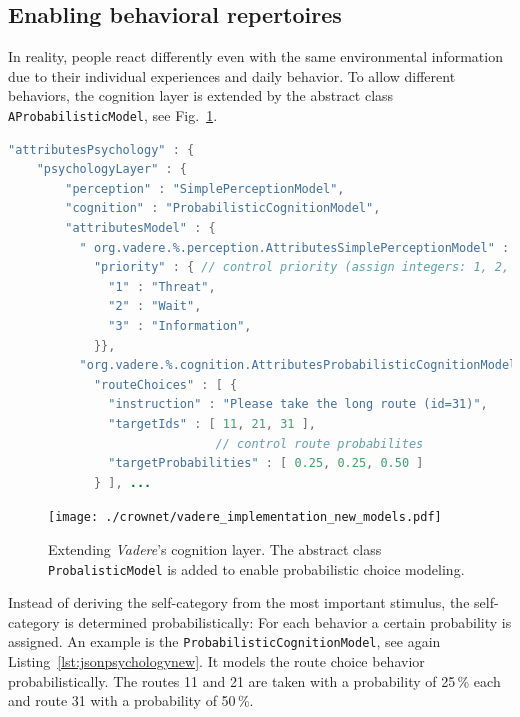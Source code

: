 \subsection{Enabling behavioral repertoires}
\label{sec:Enablingbah}

In reality, people react differently even with the same environmental information due to their individual experiences and daily behavior. To allow different behaviors, the cognition layer is extended by the abstract class \lstinline{AProbabilisticModel}, see Fig.~\ref{fig:probabilisticmodels}. 

\begin{lstlisting}[caption={Parameterization of psychological models in Vadere's scenario file. The \lstinline{targetProbabilities} parameter is a vector of probabilities. Each probability is assigned to a certain target (\lstinline{targetIds}). If the long route is recommended (\lstinline{instruction}), 25\% of the agents take target 11, 25\% take target 21. The majority (50\%) takes the long route (target 31).},language=Java,label=lst:jsonpsychologynew]
"attributesPsychology" : {
    "psychologyLayer" : {
        "perception" : "SimplePerceptionModel",
        "cognition" : "ProbabilisticCognitionModel",
        "attributesModel" : {
          " org.vadere.%.perception.AttributesSimplePerceptionModel" : {
            "priority" : { // control priority (assign integers: 1, 2, 3)
              "1" : "Threat",
              "2" : "Wait",
              "3" : "Information", 
            }},
          "org.vadere.%.cognition.AttributesProbabilisticCognitionModel" : {
            "routeChoices" : [ {
              "instruction" : "Please take the long route (id=31)",
              "targetIds" : [ 11, 21, 31 ],
                             // control route probabilites
              "targetProbabilities" : [ 0.25, 0.25, 0.50 ] 
            } ], ...
\end{lstlisting}

\begin{figure}[hbt!]
\texttt{[image: ./crownet/vadere\_implementation\_new\_models.pdf]} 
\caption[Introducing probabilistic models in \textit{Vadere}'s CognitionLayer]{Extending  \textit{Vadere}'s cognition layer. The abstract class \lstinline{ProbalisticModel} is added to enable probabilistic choice modeling.}
\label{fig:probabilisticmodels}
\end{figure}


Instead of deriving the self-category from the most important stimulus, the self-category is determined probabilistically: For each behavior a certain probability is assigned. An example is the \lstinline{ProbabilisticCognitionModel}, see again Listing~\ref{lst:jsonpsychologynew}. It models the route choice behavior probabilistically. The routes 11 and 21 are taken with a probability of 25\,\% each and route 31 with a probability of 50\,\%. 

